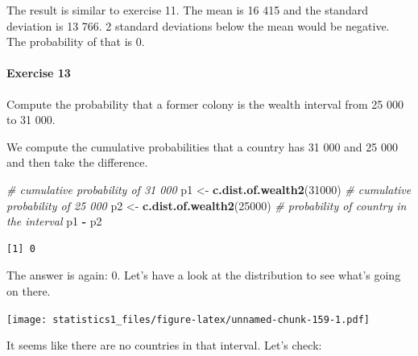 \documentclass[]{article}
\newenvironment{Shaded}{\begin{snugshade}}{\end{snugshade}}
\newcommand{\KeywordTok}[1]{\textcolor[rgb]{0.13,0.29,0.53}{\textbf{#1}}}
\newcommand{\DecValTok}[1]{\textcolor[rgb]{0.00,0.00,0.81}{#1}}
\newcommand{\StringTok}[1]{\textcolor[rgb]{0.31,0.60,0.02}{#1}}
\newcommand{\CommentTok}[1]{\textcolor[rgb]{0.56,0.35,0.01}{\textit{#1}}}
\newcommand{\OperatorTok}[1]{\textcolor[rgb]{0.81,0.36,0.00}{\textbf{#1}}}
\newcommand{\NormalTok}[1]{#1}
\let\oldparagraph\paragraph
\renewcommand{\paragraph}[1]{\oldparagraph{#1}\mbox{}}
\theoremstyle{definition}
\theoremstyle{definition}
\theoremstyle{definition}
\theoremstyle{remark}
\begin{document}
The result is similar to exercise 11. The mean is 16 415 and the
standard deviation is 13 766. 2 standard deviations below the mean would
be negative. The probability of that is 0.

\paragraph{Exercise 13}\label{exercise-13}

Compute the probability that a former colony is the wealth interval from
25 000 to 31 000.

We compute the cumulative probabilities that a country has 31 000 and 25
000 and then take the difference.

\begin{Shaded}
\begin{Highlighting}[]
\CommentTok{# cumulative probability of 31 000}
\NormalTok{p1 <-}\StringTok{ }\KeywordTok{c.dist.of.wealth2}\NormalTok{(}\DecValTok{31000}\NormalTok{)}
\CommentTok{# cumulative probability of 25 000}
\NormalTok{p2 <-}\StringTok{ }\KeywordTok{c.dist.of.wealth2}\NormalTok{(}\DecValTok{25000}\NormalTok{)}
\CommentTok{# probability of country in the interval}
\NormalTok{p1 }\OperatorTok{-}\StringTok{ }\NormalTok{p2}
\end{Highlighting}
\end{Shaded}

\begin{verbatim}
[1] 0
\end{verbatim}

The answer is again: 0. Let's have a look at the distribution to see
what's going on there.

\begin{Shaded}
\end{Shaded}

\texttt{[image: statistics1\_files/figure-latex/unnamed-chunk-159-1.pdf]}

It seems like there are no countries in that interval. Let's check:

\begin{Shaded}
\end{Shaded}
\end{document}
